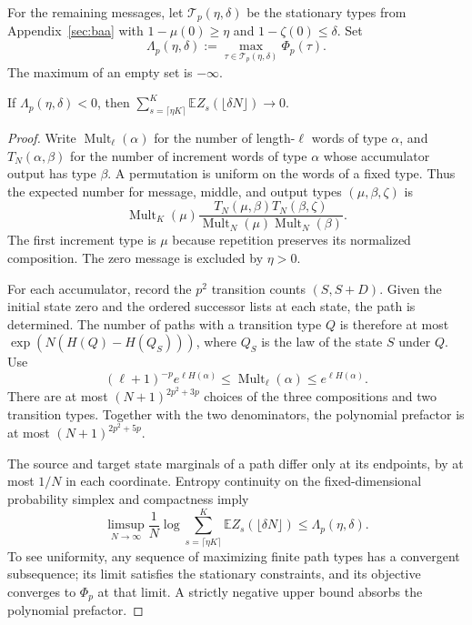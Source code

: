 For the remaining messages, let $\mathcal T_p(\eta,\delta)$ be the
stationary types from Appendix~\ref{sec:baa} with
$1-\mu(0)\ge\eta$ and $1-\zeta(0)\le\delta$. Set
\[
 \Lambda_p(\eta,\delta):=
       \max_{\tau\in\mathcal T_p(\eta,\delta)}\Phi_p(\tau).
\]
The maximum of an empty set is $-\infty$.

\begin{lemma}\label{lem:baa-bulk}
If $\Lambda_p(\eta,\delta)<0$, then
$\sum_{s=\lceil\eta K\rceil}^{K}
\mathbb E Z_s(\lfloor\delta N\rfloor)\to0$.
\end{lemma}
\begin{proof}
Write $\operatorname{Mult}_\ell(\alpha)$ for the number of length-$\ell$
words of type $\alpha$, and $T_N(\alpha,\beta)$ for the number of
increment words of type $\alpha$ whose accumulator output has type $\beta$.
A permutation is uniform on the words of a fixed type. Thus the expected
number for message, middle, and output types $(\mu,\beta,\zeta)$ is
\[
 \operatorname{Mult}_K(\mu)
 \frac{T_N(\mu,\beta)T_N(\beta,\zeta)}
      {\operatorname{Mult}_N(\mu)\operatorname{Mult}_N(\beta)}.
\]
The first increment type is $\mu$ because repetition preserves its
normalized composition. The zero message is excluded by $\eta>0$.

For each accumulator, record the $p^2$ transition counts $(S,S+D)$.
Given the initial state zero and the ordered successor lists at each
state, the path is determined. The number of paths with a transition
type $Q$ is therefore at most
$\exp(N(H(Q)-H(Q_S)))$, where $Q_S$ is the law of the state $S$
under $Q$.
Use
\[
 (\ell+1)^{-p}e^{\ell H(\alpha)}
 \le\operatorname{Mult}_\ell(\alpha)\le e^{\ell H(\alpha)}.
\]
There are at most $(N+1)^{2p^2+3p}$ choices of the three compositions
and two transition types. Together with the two denominators, the
polynomial prefactor is at most $(N+1)^{2p^2+5p}$.

The source and target state marginals of a path differ only at its
endpoints, by at most $1/N$ in each coordinate. Entropy continuity on
the fixed-dimensional probability simplex and compactness imply
\[
 \limsup_{N\to\infty}\frac1N\log
 \sum_{s=\lceil\eta K\rceil}^{K}
       \mathbb E Z_s(\lfloor\delta N\rfloor)
 \le\Lambda_p(\eta,\delta).
\]
To see uniformity, any sequence of maximizing finite path types has a
convergent subsequence; its limit satisfies the stationary constraints,
and its objective converges to $\Phi_p$ at that limit.
A strictly negative upper bound absorbs the polynomial prefactor.
\end{proof}

